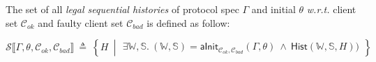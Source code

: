 \documentclass[UTF8, 8pt, a4paper ]{ctexart}
\newcommand{\absHistSet}[1]{\mathcal{S}\llbracket #1 \rrbracket}
\newcommand{\clientSet}{\mathcal{C}_{\textit{ok}}}
\newcommand{\faultyClients}{\mathcal{C}_{\textit{bad}}}
\begin{document}
\begin{small}
\begin{center}
\begin{itemize}
	\end{itemize}
	
	
	\begin{definition}
	The set of all {\textit{legal sequential histories}} of protocol spec $ \Gamma $ and initial $ \theta $ \textit{w.r.t.} client set $ \clientSet $ and faulty client set $ \faultyClients $ is defined as follow:
	
	$ \absHistSet{\Gamma, \theta, \clientSet, \faultyClients} \ \triangleq \ \left\{ H \ \middle\vert  \begin{array}{ll}
		\exists \mathbb{W}, \mathbb{S}.\ (\mathbb{W}, \mathbb{S}) = \textsf{aInit}_{\clientSet, \faultyClients}(\Gamma, \theta) \ 
		\land \ \textsf{Hist}(\mathbb{W}, \mathbb{S}, H)  )
	\end{array}  \right\} $
	\end{definition}
	
	\vspace{0.2cm}
	
	
	\begin{comment}
	\begin{definition} [\textbf{Consensus Sequential Specification}]\ 
		
		$ \textsf{Gamma}(f) \ \triangleq \ \{ f  \rightsquigarrow \texttt{FP} \} $
		
		where 
		$$\begin{array}{ll}\			
			\texttt{FP}(pval)(\theta)\ \triangleq\ \left\{  
			\begin{array}{ll}
				(pval, \theta\{ \texttt{COBJ} \rightsquigarrow pval \}) & \textsf{if } (\theta(\texttt{COBJ}) = \texttt{undef}) \land (pval \neq \texttt{undef})\\
				(val, \theta) & \textsf{if } (\theta(\texttt{COBJ}) = val) \land (val \neq \texttt{undef})\\
				
			\end{array}
			\right.\\
		\end{array}$$
	
	\vspace{0.2cm}
	and $ \texttt{COBJ} $ is the program variable name of any {abstract} consensus object
		
	general initial object:	
		$$ \theta_\texttt{ini} \ \triangleq \ \{ \texttt{COBJ} \rightsquigarrow \texttt{undef} \} $$
	
	\end{definition}
	

\end{comment}
\end{center}
\end{small}
\end{document}
